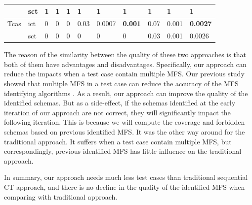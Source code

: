 \documentclass{sig-alternate}
\begin{document}
\begin{table}[htbp]
\begin{tabular}{|ll|lll|lll|lll|}
                         & sct                   & 1       & 1      & 1        & 1       & 1      & 1         & 1       & 1      & 1           \\ \hline
Tcas                     & ict                    & 0       & 0      & 0          & 0.03    & 0.0007 & \textbf{0.001  }  & 0.07    & 0.001  &\textbf{ 0.0027 }     \\
                         & sct                    & 0       & 0      & 0         & 0       & 0      & 0         & 0.03    & 0.001  & 0.0026 \\ \hline
\end{tabular}
\end{table}




The reason of the similarity between the quality of these two approaches is that both of them have advantages and disadvantages. Specifically, our approach can reduce the impacts when a test case contain multiple MFS. Our previous study showed that multiple MFS in a test case can reduce the accuracy of the MFS identifying algorithms \cite{niu2013identifying}. As a result, our approach can improve the quality of the identified schemas. But as a side-effect, if the schemas identified at the early iteration of our approach are not correct, they will significantly impact the following iteration. This is because we will compute the coverage and  forbidden schemas based on previous identified MFS.  It was the other way around for the traditional approach. It suffers when a test case contain multiple MFS, but correspondingly, previous identified MFS has little influence on the traditional approach.


In summary, our approach needs much less test cases than traditional sequential CT approach, and there is no decline in the quality of the identified MFS when comparing with traditional approach.

%
%
%
\end{document}
